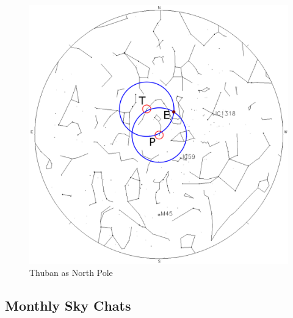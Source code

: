 \documentclass[a4paper,12pt]{extarticle}
\begin{document}
\begin{figure}[H]
	\centering
	\includegraphics[width=0.8\linewidth]{thuban.png}
	\caption{Thuban as North Pole}
	\label{precession}
\end{figure}
\clearpage 
\subsection{Monthly Sky Chats}
\end{document}
